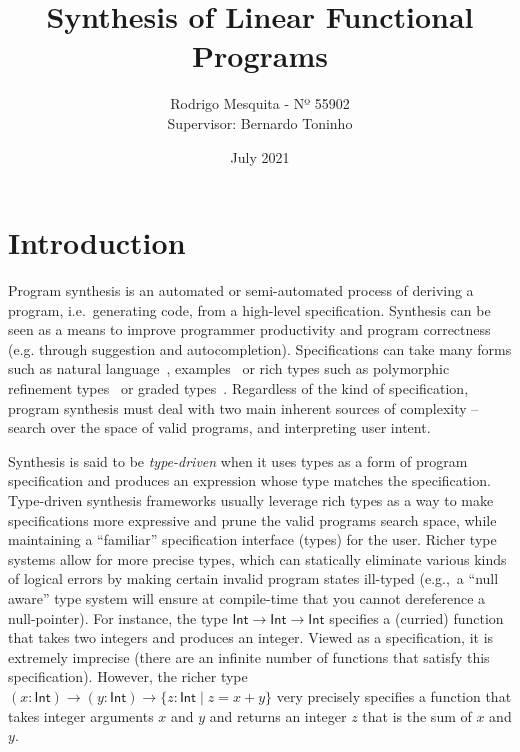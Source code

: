 \documentclass{llncs}
\title{Synthesis of Linear Functional Programs}
\author{Rodrigo Mesquita - Nº 55902 \\
    Supervisor: Bernardo Toninho}
\date{July 2021}
\institute{NOVA School of Science and Technology}
\begin{document}
\maketitle

\section{Introduction}

Program synthesis is an automated or semi-automated process of deriving a
program, i.e.~generating code, from a high-level specification. Synthesis can be
seen as a means to improve programmer productivity and program correctness
(e.g. through suggestion and autocompletion).
%
Specifications can take many forms such as natural
language~\cite{chen2021evaluating},
examples~\cite{DBLP:conf/popl/FrankleOWZ16} or rich types such as
polymorphic refinement types~\cite{DBLP:conf/pldi/PolikarpovaKS16} or
graded types~\cite{DBLP:conf/lopstr/HughesO20}. Regardless of the kind
of specification, program synthesis must deal with two main
inherent sources of complexity -- search over the space of
valid programs, and interpreting user intent.

Synthesis is said to be \emph{type-driven} when it uses types as a form of program
specification and produces an expression whose type matches the specification.
Type-driven synthesis frameworks usually leverage rich types as a way to make
specifications more expressive and prune the valid programs search space, while
maintaining a ``familiar'' specification interface (types) for the user.
%
Richer type systems allow for more precise types, which can statically eliminate
various kinds of logical errors by making certain invalid program states
ill-typed (e.g.,~a ``null aware'' type system will ensure at compile-time that
you cannot dereference a null-pointer).
%
%
For instance, the type $\mathsf{Int} \rightarrow \mathsf{Int} \rightarrow
\mathsf{Int}$ specifies a (curried) function that takes two integers and
produces an integer. Viewed as a specification, it is extremely imprecise (there
are an infinite number of functions that satisfy this specification).  However,
the richer type $(x{:}\mathsf{Int}) \rightarrow (y{:}\mathsf{Int}) \rightarrow
\{z{:}\mathsf{Int} \mid z = x+y\}$ very precisely specifies a function that
takes integer arguments $x$ and $y$ and returns an integer $z$ that is the sum
of $x$ and $y$.
\end{document}
